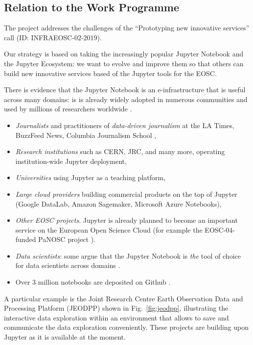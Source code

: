 %

\subsection{Relation to the Work Programme}

The \TheProject project addresses the challenges of the ``Prototyping
new innovative services'' call (ID: INFRAEOSC-02-2019).

Our strategy is based on taking the increasingly popular Jupyter
Notebook and the Jupyter Ecosystem: we want to evolve and improve them
so that others can build new innovative services based of the Jupyter
tools for the EOSC.
\medskip

There is evidence that the Jupyter Notebook is an e-infrastructure
that is useful across many domains: is is already widely adopted in
numerous communities and used by millions of researchers worldwide
\cite{jupyter-grant}.

\begin{itemize}
\item \emph{Journalists} and practitioners of \emph{data-driven
    journalism} at the LA Times, BuzzFeed News, Columbia Journalism School \cite{latimes-datadesk} \cite{columbia-nytimes} \cite{data-journalism},
\item \emph{Research institutions} such as CERN, JRC, and many more,
  operating institution-wide Jupyter deployment,
\item \emph{Universities} using Jupyter as a teaching platform,
\item \emph{Large cloud providers} building commercial products on the
  top of Jupyter (Google DataLab, Amazon Sagemaker, Microsoft Azure
  Notebooks),
\item \emph{Other EOSC projects}. Jupyter is already planned to become
  an important service on the European Open Science Cloud (for example
  the EOSC-04-funded PaNOSC project \cite{panosc}).
\item \emph{Data scientists}: some argue that the Jupyter Notebook is
  \emph{the} tool of choice for data scientists across domains
  \cite{Perkel2018}.
\item Over 3 million notebooks are deposited on Github \cite{notebookcount}.
\end{itemize}
A particular example is the Joint Research Centre Earth Observation
Data and Processing Platform (JEODPP) shown in Fig.~\ref{fig:jeodpp},
illustrating the interactive data exploration within an environment
that allows to save and communicate the data exploration
conveniently. These projects are building upon Jupyter as it is
available at the moment.
\bigskip

